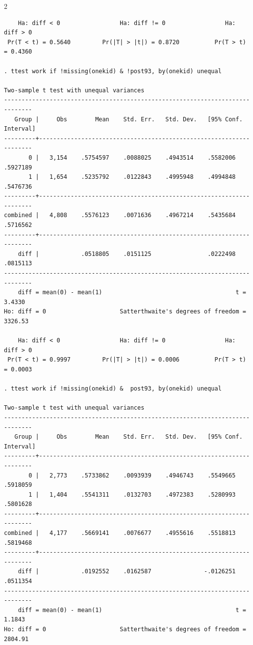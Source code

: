 \documentclass{article}
\newenvironment{changemargin}[2]{%
\begin{list}{}{%
\setlength{\topsep}{0pt}%
\setlength{\leftmargin}{#1}%
\setlength{\rightmargin}{#2}%
\setlength{\listparindent}{\parindent}%
\setlength{\itemindent}{\parindent}%
\setlength{\parsep}{\parskip}%
}%
\item[]}{\end{list}}
\begin{document}
\begin{changemargin}{-0.5in}{-0.5in}
\begin{multicols}{2}
\begin{verbatim}
    Ha: diff < 0                 Ha: diff != 0                 Ha: diff > 0
 Pr(T < t) = 0.5640         Pr(|T| > |t|) = 0.8720          Pr(T > t) = 0.4360

. ttest work if !missing(onekid) & !post93, by(onekid) unequal

Two-sample t test with unequal variances
------------------------------------------------------------------------------
   Group |     Obs        Mean    Std. Err.   Std. Dev.   [95% Conf. Interval]
---------+--------------------------------------------------------------------
       0 |   3,154    .5754597    .0088025    .4943514    .5582006    .5927189
       1 |   1,654    .5235792    .0122843    .4995948    .4994848    .5476736
---------+--------------------------------------------------------------------
combined |   4,808    .5576123    .0071636    .4967214    .5435684    .5716562
---------+--------------------------------------------------------------------
    diff |            .0518805    .0151125                .0222498    .0815113
------------------------------------------------------------------------------
    diff = mean(0) - mean(1)                                      t =   3.4330
Ho: diff = 0                     Satterthwaite's degrees of freedom =  3326.53

    Ha: diff < 0                 Ha: diff != 0                 Ha: diff > 0
 Pr(T < t) = 0.9997         Pr(|T| > |t|) = 0.0006          Pr(T > t) = 0.0003

. ttest work if !missing(onekid) &  post93, by(onekid) unequal

Two-sample t test with unequal variances
------------------------------------------------------------------------------
   Group |     Obs        Mean    Std. Err.   Std. Dev.   [95% Conf. Interval]
---------+--------------------------------------------------------------------
       0 |   2,773    .5733862    .0093939    .4946743    .5549665    .5918059
       1 |   1,404    .5541311    .0132703    .4972383    .5280993    .5801628
---------+--------------------------------------------------------------------
combined |   4,177    .5669141    .0076677    .4955616    .5518813    .5819468
---------+--------------------------------------------------------------------
    diff |            .0192552    .0162587               -.0126251    .0511354
------------------------------------------------------------------------------
    diff = mean(0) - mean(1)                                      t =   1.1843
Ho: diff = 0                     Satterthwaite's degrees of freedom =  2804.91


\end{verbatim}
\end{multicols}
\end{changemargin}
\end{document}

